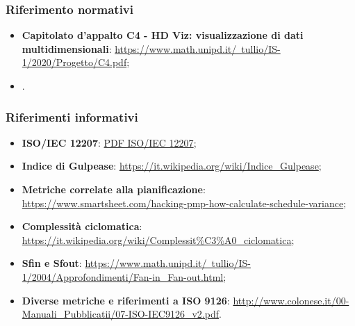         \subsubsection{Riferimento normativi}
            \begin{itemize}
                \item \textbf{Capitolato d'appalto C4 - HD Viz: visualizzazione di dati multidimensionali}:
                \href{https://www.math.unipd.it/~tullio/IS-1/2020/Progetto/C4.pdf}{https://www.math.unipd.it/~tullio/IS-1/2020/Progetto/C4.pdf};
                \item \NdP .
            \end{itemize}
            
        \subsubsection{Riferimenti informativi}
            \begin{itemize}
                \item \textbf{ISO/IEC 12207}:
                \href{https://www.math.unipd.it/~tullio/IS-1/2009/Approfondimenti/ISO_12207-1995.pdf}{PDF ISO/IEC 12207};
                \item \textbf{Indice di Gulpease}:
                \href{https://it.wikipedia.org/wiki/Indice\_Gulpease}{https://it.wikipedia.org/wiki/Indice\_Gulpease};
                \item \textbf{Metriche correlate alla pianificazione}:
                \href{https://www.smartsheet.com/hacking-pmp-how-calculate-schedule-variance}{https://www.smartsheet.com/hacking-pmp-how-calculate-schedule-variance};
                \item \textbf{Complessità ciclomatica}: \href{https://it.wikipedia.org/wiki/Complessit\%C3\%A0\_ciclomatica}{https://it.wikipedia.org/wiki/Complessit\%C3\%A0\_ciclomatica};
                \item \textbf{Sfin e Sfout}: \href{https://www.math.unipd.it/~tullio/IS-1/2004/Approfondimenti/Fan-in\_Fan-out.html}{https://www.math.unipd.it/~tullio/IS-1/2004/Approfondimenti/Fan-in\_Fan-out.html};
                \item \textbf{Diverse metriche e riferimenti a ISO 9126}: \href{http://www.colonese.it/00-Manuali\_Pubblicatii/07-ISO-IEC9126\_v2.pdf}{http://www.colonese.it/00-Manuali\_Pubblicatii/07-ISO-IEC9126\_v2.pdf}.
            \end{itemize}

